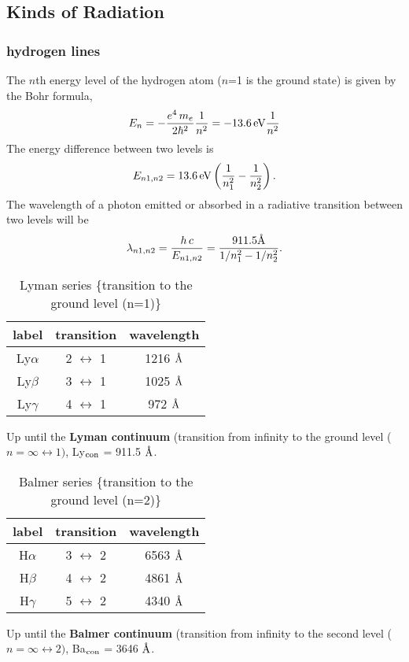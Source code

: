 \bigskip
\subsection{Kinds of Radiation}
\subsubsection{hydrogen lines}
The $n$th energy level of the hydrogen atom ($n$=1 is the ground state) is given by the Bohr formula,
\begin{equation}
    E_{n}=-\frac{e^{4}\,m_{e}}{2 \hbar^{2}}\frac{1}{n^{2}} = -13.6\,{\rm eV}\frac{1}{n^{2}}
\end{equation}
The energy difference between two levels is 
\begin{equation}
    E_{n1,n2} = 13.6\,{\rm eV}\left( \frac{1}{n_{1}^{2}} - \frac{1}{n_{2}^{2}} \right).
\end{equation}
The wavelength of a photon emitted or absorbed in a radiative transition between two levels will be
\begin{equation}
    \lambda_{n1,n2} = \frac{h\,c}{E_{n1,n2}}=\frac{911.5 {\rm \text{\normalfont\AA}}}{1/n_{1}^{2}-1/n_{2}^2}.
\end{equation}

\begin{table}[ht] 
    \caption{Lyman series \{transition to the ground level (n=1)\}}
  \centering  
  \begin{tabular}{c c c} 
  \hline \hline  
    label & transition & wavelength \\ 
  \hline 
    Ly$\alpha$ & 2 $\leftrightarrow$ 1 & 1216 $\text{\normalfont\AA}$ \\
    Ly$\beta$  & 3 $\leftrightarrow$ 1 & 1025 $\text{\normalfont\AA}$ \\
    Ly$\gamma$ & 4 $\leftrightarrow$ 1 &  972 $\text{\normalfont\AA}$ \\
  \hline 
  \end{tabular} 
\end{table}
Up until the {\bf Lyman continuum} (transition from infinity to the ground level ($n=\infty\leftrightarrow1)$,
Ly$_{\rm con}$ = 911.5 $\text{\normalfont\AA}$.

\begin{table}[ht] 
    \caption{Balmer series \{transition to the ground level (n=2)\}}
  \centering  
  \begin{tabular}{c c c} 
  \hline \hline  
    label & transition & wavelength \\ 
  \hline 
    H$\alpha$ & 3 $\leftrightarrow$ 2 & 6563 $\text{\normalfont\AA}$ \\
    H$\beta$  & 4 $\leftrightarrow$ 2 & 4861 $\text{\normalfont\AA}$ \\
    H$\gamma$ & 5 $\leftrightarrow$ 2 & 4340 $\text{\normalfont\AA}$ \\
  \hline 
  \end{tabular} 
\end{table}
Up until the {\bf Balmer continuum} (transition from infinity to the second level ($n=\infty\leftrightarrow2)$,
Ba$_{\rm con}$ = 3646 $\text{\normalfont\AA}$.


